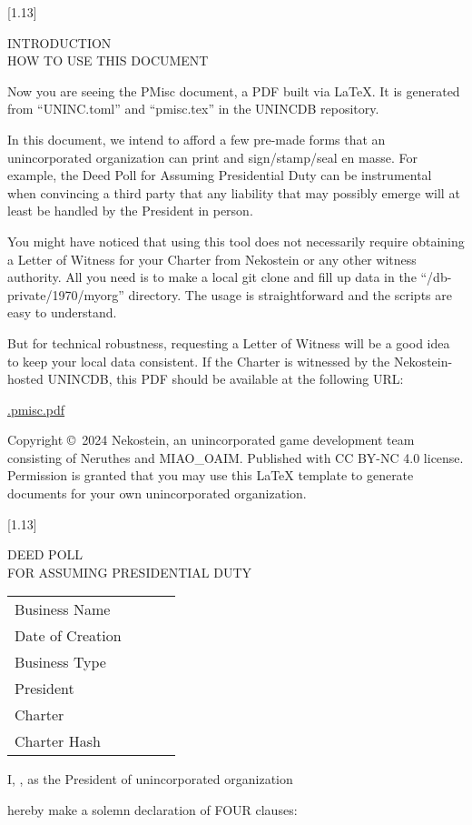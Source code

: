 \documentclass[10pt,a4paper,hidelinks]{article}
\newcommand{\newdochere}[1]{
    \setcounter{page}{1}
    \setcounter{section}{0}
    \scalebox{1}[1.13]{%
        \parbox{\textwidth}{%
            \begin{center}%
                \large\rmfamily\mdseries\strut%
                #1%
            \end{center}%
        }%
    }%
    \par
}
\newcommand{\stdorginfo}[0]{
    \parbox{\linewidth}{
        \tabcolsep=0pt
        \small
        \begin{tabu}{lX}
            \toprule
            \mdseries Business Name~~~~~~ & \fulltomldataATfullname \\
            \mdseries Date of Creation & \fulltomldataATdatecreation \\
            \mdseries Business Type & \fulltomldataATtype \\
            \mdseries President & \fulltomldataATpresident \\
            \mdseries Charter & \uninctomldataATwitnessFIRST \\
            \mdseries Charter Hash & \fulltomldataATcharterhash \\
            \bottomrule
        \end{tabu}
    }\par\vskip 10pt
}
\begin{document}
\newdochere{INTRODUCTION\\HOW TO USE THIS DOCUMENT}
\thispagestyle{empty}

Now you are seeing the PMisc document, a PDF built via \LaTeX.
It is generated from ``UNINC.toml'' and ``pmisc.tex'' in the UNINCDB repository.

In this document, we intend to afford a few pre-made forms
that an unincorporated organization can print and sign/stamp/seal en masse.
For example, the Deed Poll for Assuming Presidential Duty can be instrumental
when convincing a third party that any liability that may possibly emerge
will at least be handled by the President in person.

You might have noticed that using this tool does not necessarily require obtaining a Letter of Witness
for your Charter from Nekostein or any other witness authority.
All you need is to make a local git clone and fill up data in the ``/db-private/1970/myorg'' directory.
The usage is straightforward and the scripts are easy to understand.

But for technical robustness, requesting a Letter of Witness will be a good idea to keep your local data consistent.
If the Charter is witnessed by the Nekostein-hosted UNINCDB,
this PDF should be available at the following URL:

\begin{center}
    \href{\unincdbaltdocprefix.pmisc.pdf}{\unincdbaltdocprefix.pmisc.pdf}
\end{center}

Copyright \copyright~2024 Nekostein, an unincorporated game development team consisting of Neruthes and MIAO\_OAIM.
Published with CC BY-NC 4.0 license.
Permission is granted that you may use this \LaTeX{} template to generate documents for your own unincorporated organization.






\clearpage
\newdochere{\MakeUppercase{DEED POLL\\For Assuming Presidential Duty}}
\thispagestyle{empty}

\stdorginfo

\strut I,
\underline{\fulltomldataATpresident},
as the President of unincorporated organization

\underline{\fulltomldataATfullname}

hereby make a solemn declaration of FOUR clauses:
\end{document}
